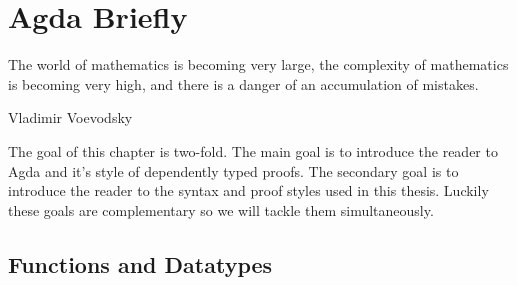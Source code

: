 \documentclass[./Thesis.tex]{subfiles}
\begin{document}
\chapter{Agda Briefly}
\label{chap:agda-briefly}

\epigraph{
  The world of mathematics is becoming very large, the complexity of
  mathematics is becoming very high, and there is a danger of an
  accumulation of mistakes.
}{Vladimir Voevodsky \cite{voevodsky-quote}}

The goal of this chapter is two-fold. The main goal is to introduce the reader
to Agda and it's style of dependently typed proofs. The secondary goal is to
introduce the reader to the syntax and proof styles used in this thesis. Luckily
these goals are complementary so we will tackle them simultaneously.

\section{Functions and Datatypes}
\label{sec:functions-and-datatypes}
\end{document}
